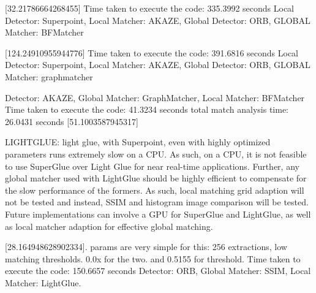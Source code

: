 [32.21786664268455]
Time taken to execute the code: 335.3992 seconds
Local Detector: Superpoint, Local Matcher: AKAZE, Global Detector: ORB, GLOBAL Matcher: BFMatcher


[124.24910955944776]
Time taken to execute the code: 391.6816 seconds
Local Detector: Superpoint, Local Matcher: AKAZE, Global Detector: ORB, GLOBAL Matcher: graphmatcher



Detector: AKAZE, Global Matcher: GraphMatcher, Local Matcher: BFMatcher
Time taken to execute the code: 41.3234 seconds
total match analysis time: 26.0431 seconds
[51.1003587945317]



LIGHTGLUE:
light glue, with Superpoint, even with highly optimized parameters runs extremely slow on a CPU. As such, on a CPU, it is not feasible to use SuperGlue over Light Glue for near real-time applications. Further, any global matcher used with LightGlue should be highly efficient to compensate for the slow performance of the formers. As such, local matching grid adaption will not be tested and instead, SSIM and histogram image comparison will be tested. Future implementations can involve a GPU for SuperGlue and LightGlue, as well as local matcher adaption for effective global matching. 

[28.164948628902334]. params are very simple for this: 256 extractions, low matching thresholds. 0.0x for the two. and 0.5155 for threshold. 
Time taken to execute the code: 150.6657 seconds
Detector: ORB, Global Matcher: SSIM, Local Matcher: LightGlue. 